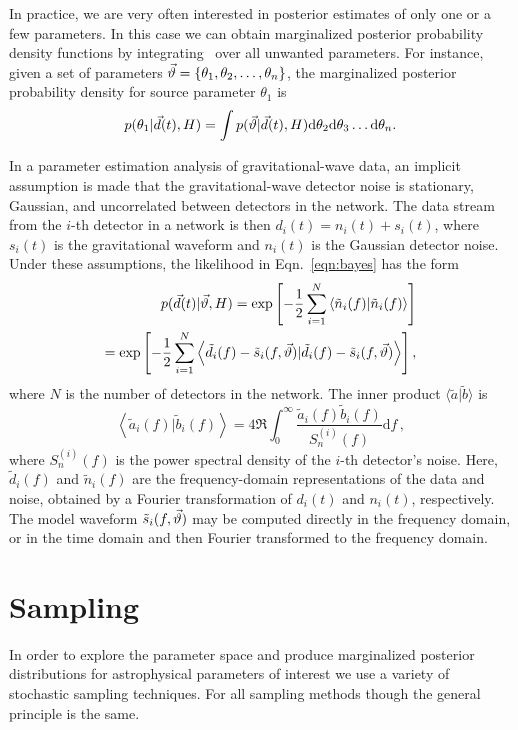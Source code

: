 In practice, we are very often interested in posterior estimates of only one or a few parameters. In this case we can obtain marginalized posterior probability density functions by integrating \posterior\ over all unwanted parameters. For instance, given a set of parameters $\vec{\vartheta}=\left\{ \theta_1,\theta_2,\ldots,\theta_n \right\}$, the marginalized posterior probability density for source parameter $\theta_1$ is
\begin{equation}\label{eqn:margpost}
p(\theta_1|\vec{d}(t),H) = \int p(\vec{\vartheta}|\vec{d}(t),H)\mathrm{d}\theta_2\mathrm{d}\theta_3\ldots\mathrm{d}\theta_n .
\end{equation}

In a parameter estimation analysis of gravitational-wave data, an implicit assumption is made that the gravitational-wave detector noise is stationary, Gaussian, and uncorrelated between detectors in the network. The data stream from the $i$-th detector in a network is then $d_{i}(t)=n_{i}(t)+s_{i}(t)$, where $s_{i}(t)$ is the gravitational waveform and $n_{i}(t)$ is the Gaussian detector noise. Under these assumptions, the likelihood in Eqn.~\ref{eqn:bayes} has the form~\cite{wainstein:1962}
\begin{eqnarray}\label{eqn:log_likelihood}
p(\vec{d}(t)|\vec{\vartheta},H) = \exp \left[ -\frac{1}{2} \sum_{i = 1}^{N} \left<\tilde{n}_{i}(f) | \tilde{n}_{i}(f)\right> \right] \nonumber\\ 
= \exp \left[ -\frac{1}{2} \sum_{i = 1}^{N} \left<\tilde{d}_{i}(f) - \tilde{s}_{i}(f, \vec{\vartheta})| \tilde{d}_{i}(f) - \tilde{s}_{i}(f, \vec{\vartheta})\right> \right] ,
\end{eqnarray}
where $N$ is the number of detectors in the network.
The inner product $\langle\tilde{a} | \tilde{b}\rangle$ is
\begin{equation}
\left<\tilde{a}_i(f) | \tilde{b}_i(f)\right> = 4\Re \int_{0}^{\infty} \frac{\tilde{a}_i(f) \tilde{b}_i(f)}{S^{(i)}_n(f)} \mathrm{d}f \,,
\end{equation}
where $S^{(i)}_n(f)$ is the power spectral density of the $i$-th
detector's noise.  Here, $\tilde{d}_{i}(f)$ and $\tilde{n}_{i}(f)$ are the
frequency-domain representations of the data and noise, obtained by a Fourier
transformation of $d_{i}(t)$ and $n_{i}(t)$, respectively.  The model waveform
$\tilde{s}_{i}(f, \vec{\vartheta})$ may be computed directly in the frequency
domain, or in the time domain and then Fourier transformed to the frequency
domain.

\section{Sampling}
In order to explore the parameter space and produce marginalized posterior distributions for astrophysical parameters of interest we use a variety of stochastic sampling techniques. For all sampling methods though the general principle is the same.


